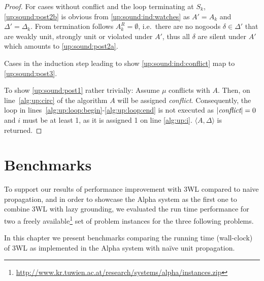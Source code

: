 \documentclass{vutinfth} %
\newtheorem{theorem}{Theorem}[section]
\newcommand{\ass}{A}
\newcommand{\sgl}{\mu}
\begin{document}
\begin{proof}
For cases without conflict and the loop terminating at $S_k$, \ref{up:sound:post2b} is obvious from \ref{up:sound:ind:watches} as $\ass' = \ass_k$ and $\Delta' = \Delta_k$. From termination follows $A_k^R = \emptyset$, i.e.~there are no nogoods $\delta \in \Delta'$ that are weakly unit, strongly unit or violated under $\ass'$, thus all $\delta$ are silent under $\ass'$ which amounts to \ref{up:sound:post2a}.

Cases in the induction step leading to show \ref{up:sound:ind:conflict} map to \ref{up:sound:post3}.

To show \ref{up:sound:post1} rather trivially: Assume $\sgl$ conflicts with $\ass$. Then, on line~\ref{alg:up:circ} of the algorithm $\ass$ will be assigned \emph{conflict}. Consequently, the loop in lines~\ref{alg:up:loop:begin}-\ref{alg:up:loop:end} is not executed as $|\emph{conflict}| = 0$ and $i$ must be at least 1, as it is assigned 1 on line \ref{alg:up:i}. $\langle \ass, \Delta \rangle$ is returned.
\end{proof}




\chapter{Benchmarks}

To support our results of performance improvement with 3WL compared to naive propagation, and in order to showcase the Alpha system as the first one to combine 3WL with lazy grounding, we evaluated the run time performance for two a freely available\footnote{\url{http://www.kr.tuwien.ac.at/research/systems/alpha/instances.zip}} set of problem instances for the three following problems.

In this chapter we present benchmarks comparing the running time (wall-clock) of 3WL as implemented in the Alpha system with na\"{i}ve unit propagation.
\end{document}
